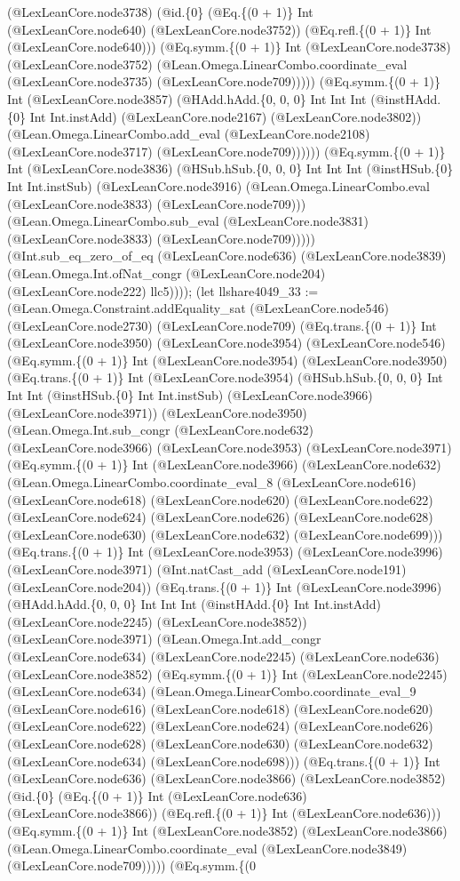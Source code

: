 \documentclass[11pt]{article}
\begin{document}
(@LexLeanCore.node3738) (@id.\{0\} (@Eq.\{(0 + 1)\} Int (@LexLeanCore.node640) (@LexLeanCore.node3752)) (@Eq.refl.\{(0 + 1)\} Int (@LexLeanCore.node640))) (@Eq.symm.\{(0 + 1)\} Int (@LexLeanCore.node3738) (@LexLeanCore.node3752) (@Lean.Omega.LinearCombo.coordinate\_eval (@LexLeanCore.node3735) (@LexLeanCore.node709))))) (@Eq.symm.\{(0 + 1)\} Int (@LexLeanCore.node3857) (@HAdd.hAdd.\{0, 0, 0\} Int Int Int (@instHAdd.\{0\} Int Int.instAdd) (@LexLeanCore.node2167) (@LexLeanCore.node3802)) (@Lean.Omega.LinearCombo.add\_eval (@LexLeanCore.node2108) (@LexLeanCore.node3717) (@LexLeanCore.node709)))))) (@Eq.symm.\{(0 + 1)\} Int (@LexLeanCore.node3836) (@HSub.hSub.\{0, 0, 0\} Int Int Int (@instHSub.\{0\} Int Int.instSub) (@LexLeanCore.node3916) (@Lean.Omega.LinearCombo.eval (@LexLeanCore.node3833) (@LexLeanCore.node709))) (@Lean.Omega.LinearCombo.sub\_eval (@LexLeanCore.node3831) (@LexLeanCore.node3833) (@LexLeanCore.node709))))) (@Int.sub\_eq\_zero\_of\_eq (@LexLeanCore.node636) (@LexLeanCore.node3839) (@Lean.Omega.Int.ofNat\_congr (@LexLeanCore.node204) (@LexLeanCore.node222) llc5)))); (let llshare4049\_33 := (@Lean.Omega.Constraint.addEquality\_sat (@LexLeanCore.node546) (@LexLeanCore.node2730) (@LexLeanCore.node709) (@Eq.trans.\{(0 + 1)\} Int (@LexLeanCore.node3950) (@LexLeanCore.node3954) (@LexLeanCore.node546) (@Eq.symm.\{(0 + 1)\} Int (@LexLeanCore.node3954) (@LexLeanCore.node3950) (@Eq.trans.\{(0 + 1)\} Int (@LexLeanCore.node3954) (@HSub.hSub.\{0, 0, 0\} Int Int Int (@instHSub.\{0\} Int Int.instSub) (@LexLeanCore.node3966) (@LexLeanCore.node3971)) (@LexLeanCore.node3950) (@Lean.Omega.Int.sub\_congr (@LexLeanCore.node632) (@LexLeanCore.node3966) (@LexLeanCore.node3953) (@LexLeanCore.node3971) (@Eq.symm.\{(0 + 1)\} Int (@LexLeanCore.node3966) (@LexLeanCore.node632) (@Lean.Omega.LinearCombo.coordinate\_eval\_8 (@LexLeanCore.node616) (@LexLeanCore.node618) (@LexLeanCore.node620) (@LexLeanCore.node622) (@LexLeanCore.node624) (@LexLeanCore.node626) (@LexLeanCore.node628) (@LexLeanCore.node630) (@LexLeanCore.node632) (@LexLeanCore.node699))) (@Eq.trans.\{(0 + 1)\} Int (@LexLeanCore.node3953) (@LexLeanCore.node3996) (@LexLeanCore.node3971) (@Int.natCast\_add (@LexLeanCore.node191) (@LexLeanCore.node204)) (@Eq.trans.\{(0 + 1)\} Int (@LexLeanCore.node3996) (@HAdd.hAdd.\{0, 0, 0\} Int Int Int (@instHAdd.\{0\} Int Int.instAdd) (@LexLeanCore.node2245) (@LexLeanCore.node3852)) (@LexLeanCore.node3971) (@Lean.Omega.Int.add\_congr (@LexLeanCore.node634) (@LexLeanCore.node2245) (@LexLeanCore.node636) (@LexLeanCore.node3852) (@Eq.symm.\{(0 + 1)\} Int (@LexLeanCore.node2245) (@LexLeanCore.node634) (@Lean.Omega.LinearCombo.coordinate\_eval\_9 (@LexLeanCore.node616) (@LexLeanCore.node618) (@LexLeanCore.node620) (@LexLeanCore.node622) (@LexLeanCore.node624) (@LexLeanCore.node626) (@LexLeanCore.node628) (@LexLeanCore.node630) (@LexLeanCore.node632) (@LexLeanCore.node634) (@LexLeanCore.node698))) (@Eq.trans.\{(0 + 1)\} Int (@LexLeanCore.node636) (@LexLeanCore.node3866) (@LexLeanCore.node3852) (@id.\{0\} (@Eq.\{(0 + 1)\} Int (@LexLeanCore.node636) (@LexLeanCore.node3866)) (@Eq.refl.\{(0 + 1)\} Int (@LexLeanCore.node636))) (@Eq.symm.\{(0 + 1)\} Int (@LexLeanCore.node3852) (@LexLeanCore.node3866) (@Lean.Omega.LinearCombo.coordinate\_eval (@LexLeanCore.node3849) (@LexLeanCore.node709))))) (@Eq.symm.\{(0 
\end{document}
